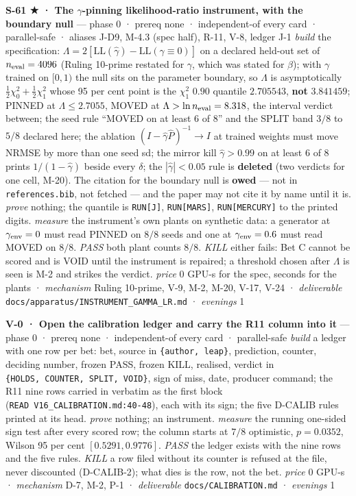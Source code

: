 \documentclass[11pt,a4paper]{article}
\newcounter{none}                 %
\theoremstyle{plain}
\theoremstyle{definition}
\theoremstyle{remark}
\begin{document}
\textbf{S-61 ★ · The \(\gamma\)-pinning likelihood-ratio instrument,
with the boundary null} --- phase 0 · prereq none · independent-of every
card · parallel-safe · aliases J-D9, M-4.3 (spec half), R-11, V-8,
ledger J-1 \emph{build} the specification:
\(\Lambda=2[\mathrm{LL}(\hat\gamma)-\mathrm{LL}(\gamma\equiv0)]\) on a
declared held-out set of \(n_{\rm eval}=4096\) (Ruling 10-prime restated
for \(\gamma\), which was stated for \(\beta\)); with \(\gamma\) trained
on \([0,1)\) the null sits on the parameter boundary, so \(\Lambda\) is
asymptotically \(\tfrac12\chi^2_0+\tfrac12\chi^2_1\) whose 95 per cent
point is the \(\chi^2_1\) \(0.90\) quantile \(2.705543\), \textbf{not}
\(3.841459\); PINNED at \(\Lambda\le2.7055\), MOVED at
\(\Lambda>\ln n_{\rm eval}=8.318\), the interval verdict between; the
seed rule ``MOVED on at least 6 of 8'' and the SPLIT band \(3/8\) to
\(5/8\) declared here; the ablation \((I-\hat\gamma\hat P)^{-1}\to I\)
at trained weights must move NRMSE by more than one seed sd; the mirror
kill \(\hat\gamma>0.99\) on at least 6 of 8 prints \(1/(1-\hat\gamma)\)
beside every \(\delta\); the \(|\hat\gamma|<0.05\) rule is
\textbf{deleted} (two verdicts for one cell, M-20). The citation for the
boundary null is \textbf{owed} --- not in \texttt{references.bib}, not
fetched --- and the paper may not cite it by name until it is.
\emph{prove} nothing; the quantile is \texttt{RUN{[}J{]}},
\texttt{RUN{[}MARS{]}}, \texttt{RUN{[}MERCURY{]}} to the printed digits.
\emph{measure} the instrument's own plants on synthetic data: a
generator at \(\gamma_{\rm env}=0\) must read PINNED on \(8/8\) seeds
and one at \(\gamma_{\rm env}=0.6\) must read MOVED on \(8/8\).
\emph{PASS} both plant counts \(8/8\). \emph{KILL} either fails: Bet C
cannot be scored and is VOID until the instrument is repaired; a
threshold chosen after \(\Lambda\) is seen is M-2 and strikes the
verdict. \emph{price} \(0\) GPU-s for the spec, seconds for the plants ·
\emph{mechanism} Ruling 10-prime, V-9, M-2, M-20, V-17, V-24 ·
\emph{deliverable} \texttt{docs/apparatus/INSTRUMENT\_GAMMA\_LR.md} ·
\emph{evenings} 1

\textbf{V-0 · Open the calibration ledger and carry the R11 column into
it} --- phase 0 · prereq none · independent-of every card ·
parallel-safe \emph{build} a ledger with one row per bet: bet, source in
\texttt{\{author,\ leap\}}, prediction, counter, deciding number, frozen
PASS, frozen KILL, realised, verdict in
\texttt{\{HOLDS,\ COUNTER,\ SPLIT,\ VOID\}}, sign of miss, date,
producer command; the R11 nine rows carried in verbatim as the first
block (\texttt{READ\ V16\_CALIBRATION.md:40-48}), each with its sign;
the five D-CALIB rules printed at its head. \emph{prove} nothing; an
instrument. \emph{measure} the running one-sided sign test after every
scored row; the column starts at \(7/8\) optimistic, \(p=0.0352\),
Wilson 95 per cent \([0.5291, 0.9776]\). \emph{PASS} the ledger exists
with the nine rows and the five rules. \emph{KILL} a row filed without
its counter is refused at the file, never discounted (D-CALIB-2); what
dies is the row, not the bet. \emph{price} \(0\) GPU-s ·
\emph{mechanism} D-7, M-2, P-1 · \emph{deliverable}
\texttt{docs/CALIBRATION.md} · \emph{evenings} 1
\end{document}
